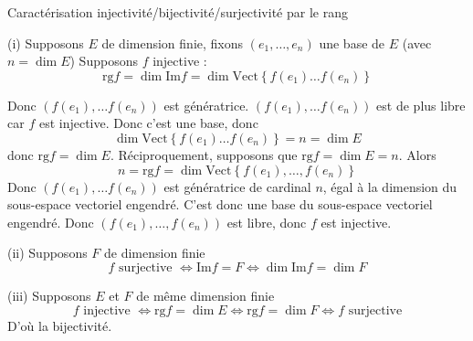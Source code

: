 \documentclass{article}
\date{22 Avril 2024}
\begin{document}
	\maketitle

	
	\begin{question_kholle}[{Soient $E, F$ deux $\mathbb{K}$ espaces vectoriels, $f \in \mathcal{L}_{\mathbb{K}}(E, F)$\\
(i) Si $E$ est de dimension finie $$f \text{ injective } \iff \mathrm{rg} f = \dim E$$
(ii) Si $F$ est de dimension finie$$f \text{ surjective } \iff \mathrm{rg} f = \dim F$$
(iii) Si $E$ et $F$ sont de même dimension finie $$f \text{ bijective } \iff f \text{ injective } \iff f \text{ sujective }$$}]
		{Caractérisation injectivité/bijectivité/surjectivité par le rang}

(i)
Supposons $E$ de dimension finie, fixons $(e_{1}, \dots, e_{n})$ une base de $E$ (avec $n = \dim E$)
Supposons $f$ injective :
$$
\mathrm{rg} f = \dim \mathrm{Im} f = \dim \text{Vect} \left\{ f(e_{1}) \dots f(e_{n}) \right\}  
$$

Donc $(f(e_{1}), \dots f(e_{n}))$ est génératrice.
$(f(e_{1}), \dots f(e_{n}))$ est de plus libre car $f$ est injective.
Donc c'est une base, donc
$$
\dim \text{Vect} \left\{ f(e_{1}) \dots f(e_{n}) \right\}  =n = \dim E
$$
donc $\mathrm{rg} f = \dim E$.
Réciproquement, supposons que $\mathrm{rg} f = \dim E = n$.
Alors $$n = \mathrm{rg} f = \dim \text{Vect} \left\{ f(e_{1}),\dots,f(e_{n}) \right\}$$
Donc $(f(e_{1}), \dots f(e_{n}))$ est génératrice de cardinal $n$, égal à la dimension du sous-espace vectoriel engendré. C'est donc une base du sous-espace vectoriel engendré.
Donc $(f(e_{1}),\dots , f(e_{n}))$ est libre, donc $f$ est injective.

(ii)
Supposons $F$ de dimension finie
$$
f \text{ surjective } \iff \mathrm{Im} f = F \iff \dim \mathrm{Im} f = \dim F
$$

(iii)
Supposons $E$ et $F$ de même dimension finie
$$
f \text{ injective } \iff \mathrm{rg} f = \dim E \iff \mathrm{rg} f = \dim F \iff f \text{ surjective}
$$
D'où la bijectivité.
	\end{question_kholle}
\end{document}
